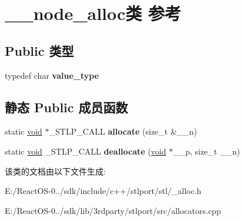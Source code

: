 \hypertarget{class____node__alloc}{}\section{\+\_\+\+\_\+node\+\_\+alloc类 参考}
\label{class____node__alloc}
\subsection*{Public 类型}
\begin{DoxyCompactItemize}
\item 
\mbox{\label{class____node__alloc_a0c23f9de5e3dbd8000df387c5cd04b1c}} 
typedef char {\bfseries value\+\_\+type}
\end{DoxyCompactItemize}
\subsection*{静态 Public 成员函数}
\begin{DoxyCompactItemize}
\item 
\mbox{\label{class____node__alloc_a53347d9ac3a69dad79166f1954e72fe4}} 
static \hyperlink{interfacevoid}{void} $\ast$\+\_\+\+S\+T\+L\+P\+\_\+\+C\+A\+LL {\bfseries allocate} (size\+\_\+t \&\+\_\+\+\_\+n)
\item 
\mbox{\label{class____node__alloc_a59c8fddbc570425dec5b1a3a27a8dd3f}} 
static \hyperlink{interfacevoid}{void} \+\_\+\+S\+T\+L\+P\+\_\+\+C\+A\+LL {\bfseries deallocate} (\hyperlink{interfacevoid}{void} $\ast$\+\_\+\+\_\+p, size\+\_\+t \+\_\+\+\_\+n)
\end{DoxyCompactItemize}


该类的文档由以下文件生成\+:\begin{DoxyCompactItemize}
\item 
E\+:/\+React\+O\+S-\/0../sdk/include/c++/stlport/stl/\+\_\+alloc.\+h\item 
E\+:/\+React\+O\+S-\/0../sdk/lib/3rdparty/stlport/src/allocators.\+cpp\end{DoxyCompactItemize}
